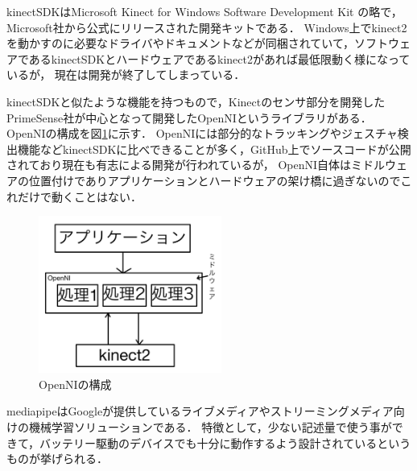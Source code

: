 \documentclass[titlepage]{jarticle}
\begin{document}
kinectSDKはMicrosoft Kinect for Windows Software Development Kit の略で，Microsoft社から公式にリリースされた開発キットである．
Windows上でkinect2を動かすのに必要なドライバやドキュメントなどが同梱されていて，ソフトウェアであるkinectSDKとハードウェアであるkinect2があれば最低限動く様になっているが，
現在は開発が終了してしまっている．

kinectSDKと似たような機能を持つもので，Kinectのセンサ部分を開発したPrimeSense社が中心となって開発したOpenNIというライブラリがある．
OpenNIの構成を図\ref{app}に示す．
OpenNIには部分的なトラッキングやジェスチャ検出機能などkinectSDKに比べできることが多く，GitHub上でソースコードが公開されており現在も有志による開発が行われているが，
OpenNI自体はミドルウェアの位置付けでありアプリケーションとハードウェアの架け橋に過ぎないのでこれだけで動くことはない．

\begin{figure}[b!]
  \centering
  \includegraphics[width=6cm]{img/app1.jpg}
  \caption{OpenNIの構成}
  \label{app}
\end{figure}



mediapipeはGoogleが提供しているライブメディアやストリーミングメディア向けの機械学習ソリューションである．
特徴として，少ない記述量で使う事ができて，バッテリー駆動のデバイスでも十分に動作するよう設計されているというものが挙げられる．



\end{document}
